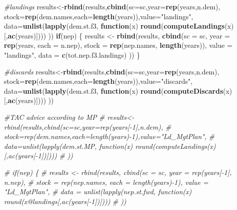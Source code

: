 \documentclass[
]{article}
\newenvironment{Shaded}{\begin{snugshade}}{\end{snugshade}}
\newcommand{\CommentTok}[1]{\textcolor[rgb]{0.56,0.35,0.01}{\textit{#1}}}
\newcommand{\ControlFlowTok}[1]{\textcolor[rgb]{0.13,0.29,0.53}{\textbf{#1}}}
\newcommand{\DataTypeTok}[1]{\textcolor[rgb]{0.13,0.29,0.53}{#1}}
\newcommand{\KeywordTok}[1]{\textcolor[rgb]{0.13,0.29,0.53}{\textbf{#1}}}
\newcommand{\NormalTok}[1]{#1}
\newcommand{\StringTok}[1]{\textcolor[rgb]{0.31,0.60,0.02}{#1}}
\begin{document}
\begin{Shaded}
\begin{Highlighting}[]
{{{{{    \CommentTok{#landings}
\NormalTok{    results<-}\KeywordTok{rbind}\NormalTok{(results,}\KeywordTok{cbind}\NormalTok{(}\DataTypeTok{sc=}\NormalTok{sc,}\DataTypeTok{year=}\KeywordTok{rep}\NormalTok{(years,n.dem),}
                                 \DataTypeTok{stock=}\KeywordTok{rep}\NormalTok{(dem.names,}\DataTypeTok{each=}\KeywordTok{length}\NormalTok{(years)),}\DataTypeTok{value=}\StringTok{"landings"}\NormalTok{,}
                                 \DataTypeTok{data=}\KeywordTok{unlist}\NormalTok{(}\KeywordTok{lapply}\NormalTok{(dem.st.f3, }\ControlFlowTok{function}\NormalTok{(x) }\KeywordTok{round}\NormalTok{(}\KeywordTok{computeLandings}\NormalTok{(x)[,}\KeywordTok{ac}\NormalTok{(years)])))}
\NormalTok{    ))}
    \ControlFlowTok{if}\NormalTok{(nep) \{}
\NormalTok{    results <-}\StringTok{ }\KeywordTok{rbind}\NormalTok{(results, }\KeywordTok{cbind}\NormalTok{(}\DataTypeTok{sc =}\NormalTok{ sc, }\DataTypeTok{year =} \KeywordTok{rep}\NormalTok{(years, }\DataTypeTok{each =}\NormalTok{ n.nep),}
                    \DataTypeTok{stock =} \KeywordTok{rep}\NormalTok{(nep.names, }\KeywordTok{length}\NormalTok{(years)), }\DataTypeTok{value =} \StringTok{"landings"}\NormalTok{,}
                    \DataTypeTok{data =} \KeywordTok{c}\NormalTok{(tot.nep.f3.landings)}
\NormalTok{                    ))}
\NormalTok{    \}}

    \CommentTok{#discards}
\NormalTok{    results<-}\KeywordTok{rbind}\NormalTok{(results,}\KeywordTok{cbind}\NormalTok{(}\DataTypeTok{sc=}\NormalTok{sc,}\DataTypeTok{year=}\KeywordTok{rep}\NormalTok{(years,n.dem),}
                                 \DataTypeTok{stock=}\KeywordTok{rep}\NormalTok{(dem.names,}\DataTypeTok{each=}\KeywordTok{length}\NormalTok{(years)),}\DataTypeTok{value=}\StringTok{"discards"}\NormalTok{,}
                                 \DataTypeTok{data=}\KeywordTok{unlist}\NormalTok{(}\KeywordTok{lapply}\NormalTok{(dem.st.f3, }\ControlFlowTok{function}\NormalTok{(x) }\KeywordTok{round}\NormalTok{(}\KeywordTok{computeDiscards}\NormalTok{(x)[,}\KeywordTok{ac}\NormalTok{(years)])))}
\NormalTok{    ))}

    \CommentTok{#TAC advice according to MP}
\CommentTok{#    results<-rbind(results,cbind(sc=sc,year=rep(years[-1],n.dem),}
\CommentTok{#                                 stock=rep(dem.names,each=length(years)-1),value="Ld_MgtPlan",}
\CommentTok{#                                 data=unlist(lapply(dem.st.MP, function(x) round(computeLandings(x)[,ac(years[-1])])))}
 \CommentTok{#   ))}

\CommentTok{#    if(nep) \{}
\CommentTok{#    results <- rbind(results, cbind(sc = sc, year = rep(years[-1], n.nep),}
\CommentTok{#                   stock = rep(nep.names, each = length(years)-1), value = "Ld_MgtPlan",}
\CommentTok{#                   data = unlist(lapply(nep.st.fwd, function(x) round(x@landings[,ac(years[-1])])))}
\CommentTok{#                   ))}

}}}}}
\end{Highlighting}
\end{Shaded}
\end{document}
